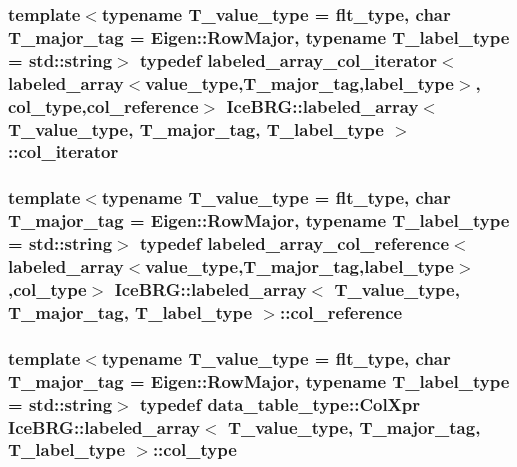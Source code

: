 \subsubsection[{col\+\_\+iterator}]{\setlength{\rightskip}{0pt plus 5cm}template$<$typename T\+\_\+value\+\_\+type = flt\+\_\+type, char T\+\_\+major\+\_\+tag = Eigen\+::\+Row\+Major, typename T\+\_\+label\+\_\+type = std\+::string$>$ typedef {\bf labeled\+\_\+array\+\_\+col\+\_\+iterator}$<${\bf labeled\+\_\+array}$<${\bf value\+\_\+type},T\+\_\+major\+\_\+tag,{\bf label\+\_\+type}$>$, {\bf col\+\_\+type},{\bf col\+\_\+reference}$>$ {\bf Ice\+B\+R\+G\+::labeled\+\_\+array}$<$ T\+\_\+value\+\_\+type, T\+\_\+major\+\_\+tag, T\+\_\+label\+\_\+type $>$\+::{\bf col\+\_\+iterator}}\label{classIceBRG_1_1labeled__array_a5013bbfc828083b72537e79ded5fe56d}
\hypertarget{classIceBRG_1_1labeled__array_aa7217b6c3b4a663d16f579aebab5e5cf}{}
\subsubsection[{col\+\_\+reference}]{\setlength{\rightskip}{0pt plus 5cm}template$<$typename T\+\_\+value\+\_\+type = flt\+\_\+type, char T\+\_\+major\+\_\+tag = Eigen\+::\+Row\+Major, typename T\+\_\+label\+\_\+type = std\+::string$>$ typedef {\bf labeled\+\_\+array\+\_\+col\+\_\+reference}$<${\bf labeled\+\_\+array}$<${\bf value\+\_\+type},T\+\_\+major\+\_\+tag,{\bf label\+\_\+type}$>$,{\bf col\+\_\+type}$>$ {\bf Ice\+B\+R\+G\+::labeled\+\_\+array}$<$ T\+\_\+value\+\_\+type, T\+\_\+major\+\_\+tag, T\+\_\+label\+\_\+type $>$\+::{\bf col\+\_\+reference}}\label{classIceBRG_1_1labeled__array_aa7217b6c3b4a663d16f579aebab5e5cf}
\hypertarget{classIceBRG_1_1labeled__array_a4ee8f2983b8f309f1a8a470c12f56f2f}{}
\subsubsection[{col\+\_\+type}]{\setlength{\rightskip}{0pt plus 5cm}template$<$typename T\+\_\+value\+\_\+type = flt\+\_\+type, char T\+\_\+major\+\_\+tag = Eigen\+::\+Row\+Major, typename T\+\_\+label\+\_\+type = std\+::string$>$ typedef data\+\_\+table\+\_\+type\+::\+Col\+Xpr {\bf Ice\+B\+R\+G\+::labeled\+\_\+array}$<$ T\+\_\+value\+\_\+type, T\+\_\+major\+\_\+tag, T\+\_\+label\+\_\+type $>$\+::{\bf col\+\_\+type}}\label{classIceBRG_1_1labeled__array_a4ee8f2983b8f309f1a8a470c12f56f2f}
\hypertarget{classIceBRG_1_1labeled__array_a4592932c9e975c4777e0d89990ac4e5a}{}
